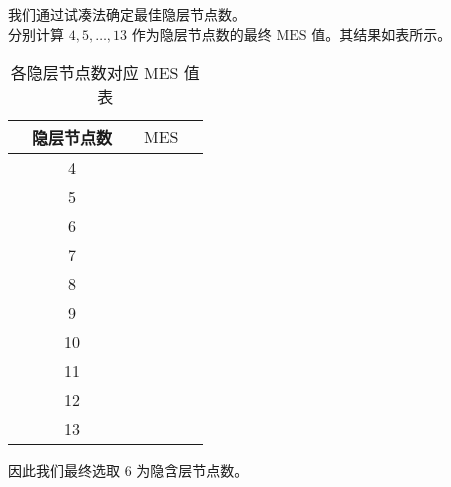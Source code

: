     我们通过试凑法确定最佳隐层节点数。\\
    分别计算 $4,5,\dots,13$ 作为隐层节点数的最终 $\mathrm{MES}$ 值。其结果如表所示。
    \begin{table}[htb]
      \centering
      \caption{各隐层节点数对应 $\mathrm{MES}$ 值表}
      \begin{tabular*}{0.618\paperwidth}{@{\extracolsep{\fill}}ccccc}
        \toprule[1.5pt]
        &隐层节点数 && $\mathrm{MES}$ &\\
        \midrule[1pt]
        &4 && &\\
        &5 && &\\
        &6 && &\\
        &7 && &\\
        &8 && &\\
        &9 && &\\
        &10 && &\\
        &11 && &\\
        &12 && &\\
        &13 && &\\
        \bottomrule[1.5pt]
      \end{tabular*}
      \label{tab:shurushuchu}
    \end{table}

    因此我们最终选取 6 为隐含层节点数。